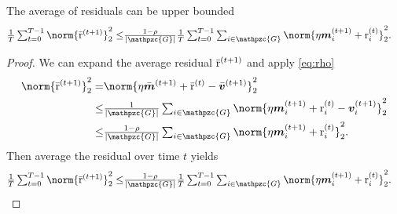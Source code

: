 \documentclass{article}
\newcommand{\gset}{\ensuremath{{\mathpzc{G}}}}
\begin{document}
\begin{lemma}\label{lemma:r_bar}
  The average of residuals can be upper bounded
  \begin{align*}
    \tfrac{1}{T}\tsum_{t=0}^{T-1} \norm{\bar{\rr}^{(t+1)}}_2^2
    \le &
    \tfrac{1-\rho}{|\gset|}\tfrac{1}{T}\tsum_{t=0}^{T-1} \tsum_{i\in\gset} \norm{\eta{\mm}_i^{(t+1)} + {\rr}_i^{(t)}}_2^2.
  \end{align*}
\end{lemma}
\begin{proof}
  We can expand the average residual $\bar{{\textnormal{r}}}^{(t+1)}$ and apply \eqref{eq:rho}
  \begin{align*}
    \norm{\bar{\rr}^{(t+1)}}_2^2
    =   & \norm{\eta\bar{\mm}^{(t+1)} + \bar{\rr}^{(t)} - \bar{\vv}^{(t+1)}  }_2^2                        \\
    \le &
    \tfrac{1}{|\gset|}\tsum_{i\in\gset} \norm{\eta{\mm}_i^{(t+1)} + {\rr}_i^{(t)} - {\vv}_i^{(t+1)} }_2^2 \\
    \le &
    \tfrac{1-\rho}{|\gset|}\tsum_{i\in\gset} \norm{\eta{\mm}_i^{(t+1)} + {\rr}_i^{(t)}}_2^2.
  \end{align*}
  Then average the residual over time $t$ yields
  \begin{align*}
    \tfrac{1}{T}\tsum_{t=0}^{T-1} \norm{\bar{\rr}^{(t+1)}}_2^2
    \le &
    \tfrac{1-\rho}{|\gset|}\tfrac{1}{T}\tsum_{t=0}^{T-1} \tsum_{i\in\gset} \norm{\eta{\mm}_i^{(t+1)} + {\rr}_i^{(t)}}_2^2.
  \end{align*}
\end{proof}
\end{document}
